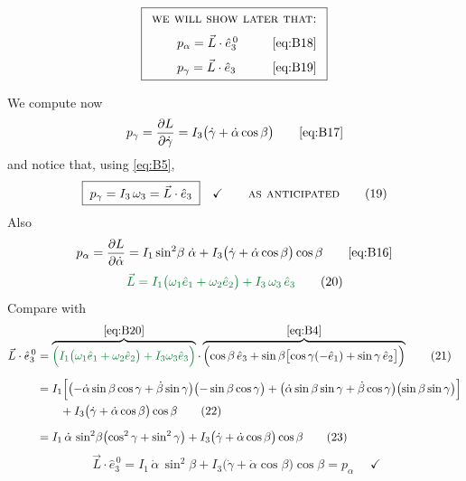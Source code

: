 \documentclass[11pt]{article}
\newcommand{\ehat}[1]{\hat{e}_{#1}}
\newcommand{\ezero}[1]{\hat{e}^{\,0}_{#1}}
\begin{document}
\begin{equation*}
\fbox{$\displaystyle
\begin{array}{l}
\textsc{we will show later that:}\\[6pt]
\qquad p_\alpha = \vec{L}\cdot\ezero{3} \hfill \eqref{eq:B18}\\[6pt]
\qquad p_\gamma = \vec{L}\cdot\ehat{3} \hfill \eqref{eq:B19}
\end{array}$}
\end{equation*}

We compute now
\begin{equation*}
p_\gamma = \pd{L}{\dot{\gamma}} = I_3\bigl(\dot{\gamma}+\dot{\alpha}\cos\beta\bigr)
\tag*{\eqref{eq:B17}}
\end{equation*}
and notice that, using \eqref{eq:B5},
\begin{equation*}
\boxed{\;p_\gamma = I_3\,\omega_3 = \vec{L}\cdot\ehat{3}\;}\quad\checkmark
\qquad \text{\textsc{as anticipated}}
\tag{19}\label{eq:B19}
\end{equation*}
Also
\begin{equation*}
p_\alpha = \pd{L}{\dot{\alpha}}
= I_1\sin^{2}\!\beta\;\dot{\alpha} + I_3\bigl(\dot{\gamma}+\dot{\alpha}\cos\beta\bigr)\cos\beta
\tag*{\eqref{eq:B16}}
\end{equation*}
\begin{equation*}
\textcolor{lecgreen}{\vec{L} = I_1\bigl(\omega_1\ehat{1} + \omega_2\ehat{2}\bigr) + I_3\,\omega_3\,\ehat{3}}
\tag{20}\label{eq:B20}
\end{equation*}
Compare with
\begin{align*}
\vec{L}\cdot\ezero{3}
&= \overbrace{\textcolor{lecgreen}{\Bigl(I_1\bigl(\omega_1\ehat{1}+\omega_2\ehat{2}\bigr)+I_3\omega_3\ehat{3}\Bigr)}}^{\eqref{eq:B20}}
\cdot
\overbrace{\Bigl(\cos\beta\,\ehat{3}+\sin\beta\bigl[\cos\gamma(-\ehat{1})+\sin\gamma\,\ehat{2}\bigr]\Bigr)}^{\eqref{eq:B4}}
\tag{21}\label{eq:B21}\\[6pt]
&= I_1\Bigl[\bigl(-\dot{\alpha}\sin\beta\cos\gamma+\dot{\beta}\sin\gamma\bigr)\bigl(-\sin\beta\cos\gamma\bigr)
+ \bigl(\dot{\alpha}\sin\beta\sin\gamma+\dot{\beta}\cos\gamma\bigr)\bigl(\sin\beta\sin\gamma\bigr)\Bigr]\\
&\qquad + I_3\bigl(\dot{\gamma}+\dot{\alpha}\cos\beta\bigr)\cos\beta
\tag{22}\label{eq:B22}\\[6pt]
&= I_1\,\dot{\alpha}\,\sin^{2}\!\beta\bigl(\cos^{2}\gamma+\sin^{2}\gamma\bigr)
+ I_3\bigl(\dot{\gamma}+\dot{\alpha}\cos\beta\bigr)\cos\beta
\tag{23}\label{eq:B23}
\end{align*}
\begin{equation*}
\boxed{\;
\vec{L}\cdot\ezero{3} = I_1\,\dot{\alpha}\,\sin^{2}\!\beta
+ I_3\bigl(\dot{\gamma}+\dot{\alpha}\cos\beta\bigr)\cos\beta = p_\alpha \;}\quad\checkmark
\tag{18}\label{eq:B18}
\end{equation*}
\end{document}

